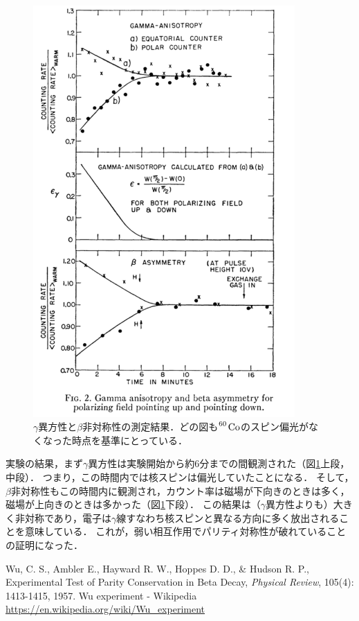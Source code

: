 \begin{figure}[htbp]
  \centering
  \includegraphics[width=10cm]{wu_expt.png}
  \caption{$\gamma$異方性と$\beta$非対称性の測定結果．どの図も$\ce{^60 Co}$のスピン偏光がなくなった時点を基準にとっている．}
  \label{fig:wu_expt}
\end{figure}

実験の結果，まず$\gamma$異方性は実験開始から約6分までの間観測された（図\ref{fig:wu_expt}上段，中段）．
つまり，この時間内では核スピンは偏光していたことになる．
そして，$\beta$非対称性もこの時間内に観測され，カウント率は磁場が下向きのときは多く，磁場が上向きのときは多かった（図\ref{fig:wu_expt}下段）．
この結果は（$\gamma$異方性よりも）大きく非対称であり，電子は$\gamma$線すなわち核スピンと異なる方向に多く放出されることを意味している．
これが，弱い相互作用でパリティ対称性が破れていることの証明になった．

\begin{thebibliography}{99}
   Wu, C. S., Ambler E., Hayward R. W., Hoppes D. D., \& Hudson R. P., Experimental Test of Parity Conservation in Beta Decay, \textit{Physical Review}, 105(4): 1413-1415, 1957.
   Wu experiment - Wikipedia \\
  \url{https://en.wikipedia.org/wiki/Wu_experiment}
\end{thebibliography}